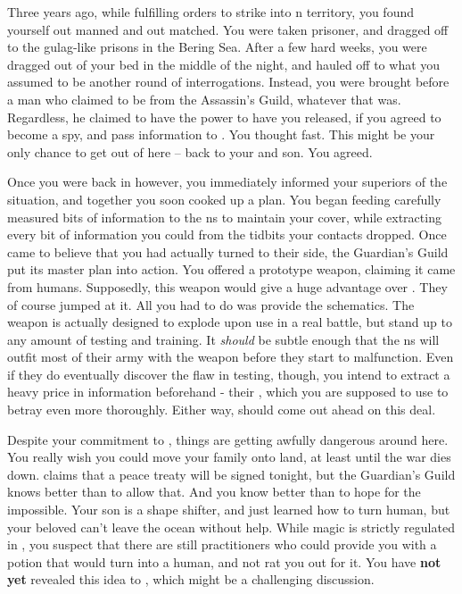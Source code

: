 \documentclass[char]{NeptuneBall}
\begin{document}
Three years ago, while fulfilling orders to strike into \pPacifica{}n territory, you found yourself out manned and out matched. You were taken prisoner, and dragged off to the gulag-like prisons in the Bering Sea. After a few hard weeks, you were dragged out of your bed in the middle of the night, and hauled off to what you assumed to be another round of interrogations. Instead, you were brought before a man who claimed to be from the Assassin's Guild, whatever that was. Regardless, he claimed to have the power to have you released, if you agreed to become a spy, and pass information to \pPacifica{}. You thought fast. This might be your only chance to get out of here -- back to your \cQueen{\spouse} and son. You agreed.

Once you were back in \pAtlantis{} however, you immediately informed your superiors of the situation, and together you soon cooked up a plan. You began feeding carefully measured bits of information to the \pPacifica{}ns to maintain your cover, while extracting every bit of information you could from the tidbits your contacts dropped. Once \pPacifica{} came to believe that you had actually turned to their side, the Guardian's Guild put its master plan into action. You offered \pPacifica{} a prototype weapon, claiming it came from humans. Supposedly, this weapon would give \pPacifica{} a huge advantage over \pAtlantis{}. They of course jumped at it.  All you had to do was provide the schematics. The weapon is actually designed to explode upon use in a real battle, but stand up to any amount of testing and training. It \emph{should} be subtle enough that the \pPacifica{}ns will outfit most of their army with the weapon before they start to malfunction. Even if they do eventually discover the flaw in testing, though, you intend to extract a heavy price in information beforehand - their \iBattlePlan{}, which you are supposed to use to betray \pAtlantis{} even more thoroughly. Either way, \pAtlantis{} should come out ahead on this deal.

Despite your commitment to \pAtlantis{}, things are getting awfully dangerous around here. You really wish you could move your family onto land, at least until the war dies down. \cKing{\King} \cKing{} claims that a peace treaty will be signed tonight, but the Guardian's Guild knows better than to allow that. And you know better than to hope for the impossible. Your son is a shape shifter, and just learned how to turn human, but your beloved \cQueen{\spouse} \cQueen{} can't leave the ocean without help. While magic is strictly regulated in \pAtlantis{}, you suspect that there are still practitioners who could provide you with a potion that would turn \cQueen{} into a human, and not rat you out for it. You have {\bf not yet} revealed this idea to \cQueen{}, which might be a challenging discussion.
\end{document}

